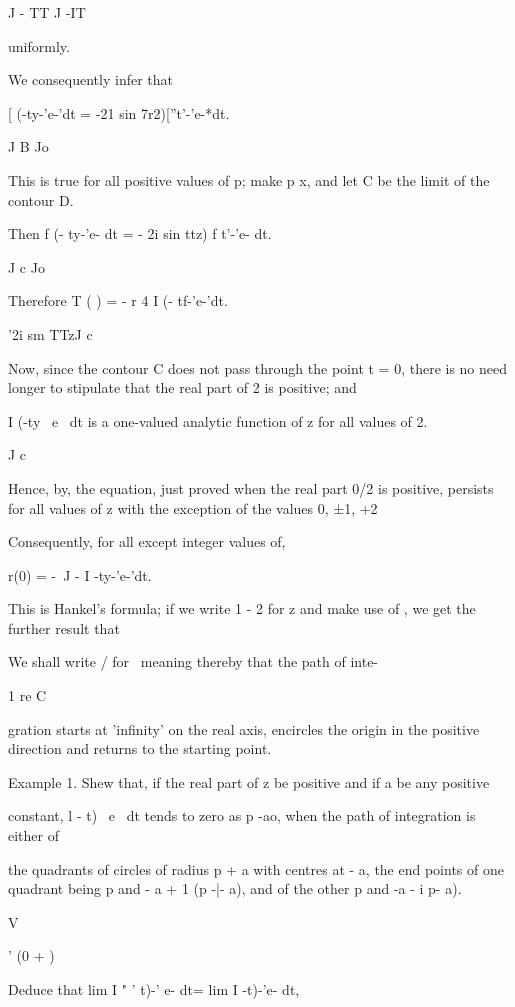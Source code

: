 J - TT J -IT

uniformly.

We consequently infer that

[ (-ty-'e-'dt = -21 sin 7r2)[''t'-'e-*dt.

J B Jo

This is true for all positive values of p; make p x, and let C be
the limit of the contour D.

Then f (- ty-'e- dt = - 2i sin ttz) f t'-'e- dt.

J c Jo

Therefore T ( ) = - r 4 I (- tf-'e-'dt.

'2i sm TTzJ c

Now, since the contour C does not pass through the point t = 0, there
is no need longer to stipulate that the real part of 2 is positive;
and

I (-ty~ e~ dt is a one-valued analytic function of z for all values of
2.

J c

Hence, by, the equation, just proved when the real part 0/2 is
positive, persists for all values of z with the exception of the
values 0, ±1, +2

Consequently, for all except integer values of,

r(0) = -\ J - I -ty-'e-'dt.

This is Hankel's formula; if we write 1 - 2 for z and make use of
, we get the further result that

We shall write / for \, meaning thereby that the path of inte-

1 re C

gration starts at 'infinity' on the real axis, encircles the origin in
the positive direction and returns to the starting point.

Example 1. Shew that, if the real part of z be positive and if a be
any positive

constant, l - t)~ e~ dt tends to zero as p -ao, when the path of
integration is either of

the quadrants of circles of radius p + a with centres at - a, the end
points of one quadrant being p and - a + 1 (p -|- a), and of the other
p and -a - i p- a).

V

' (0 + )

%
%

Deduce that lim I " ' t)-' e- dt= lim I -t)-'e- dt,

